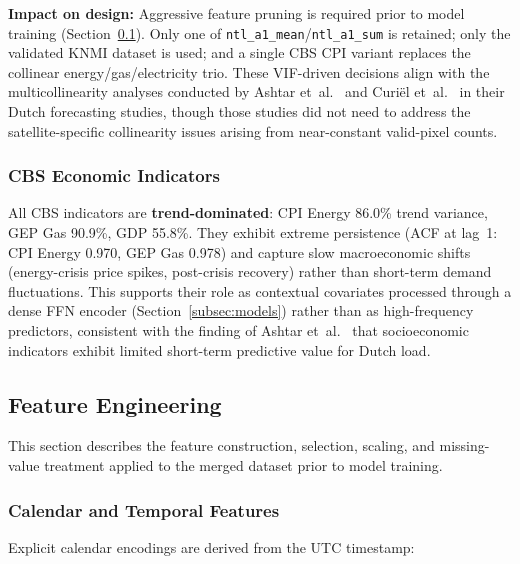 \noindent\textbf{Impact on design:} Aggressive feature pruning is required prior to model training (Section~\ref{subsec:feature_engineering}). Only one of \texttt{ntl\_a1\_mean}/\texttt{ntl\_a1\_sum} is retained; only the validated KNMI dataset is used; and a single CBS CPI variant replaces the collinear energy/gas/electricity trio. These VIF-driven decisions align with the multicollinearity analyses conducted by Ashtar et~al.~\cite{ashtar_hybrid_2025} and Curi\"el et~al.~\cite{curiel_integrating_2025} in their Dutch forecasting studies, though those studies did not need to address the satellite-specific collinearity issues arising from near-constant valid-pixel counts.

\subsubsection{CBS Economic Indicators}
\label{subsubsec:eda_cbs}

All CBS indicators are \textbf{trend-dominated}: CPI Energy 86.0\% trend variance, GEP Gas 90.9\%, GDP 55.8\%. They exhibit extreme persistence (ACF at lag~1: CPI Energy 0.970, GEP Gas 0.978) and capture slow macroeconomic shifts (energy-crisis price spikes, post-crisis recovery) rather than short-term demand fluctuations. This supports their role as contextual covariates processed through a dense FFN encoder (Section~\ref{subsec:models}) rather than as high-frequency predictors, consistent with the finding of Ashtar et~al.~\cite{ashtar_hybrid_2025} that socioeconomic indicators exhibit limited short-term predictive value for Dutch load.


\subsection{Feature Engineering}
\label{subsec:feature_engineering}

This section describes the feature construction, selection, scaling, and missing-value treatment applied to the merged dataset prior to model training.

\subsubsection{Calendar and Temporal Features}
\label{subsubsec:calendar_features}

Explicit calendar encodings are derived from the UTC timestamp:

